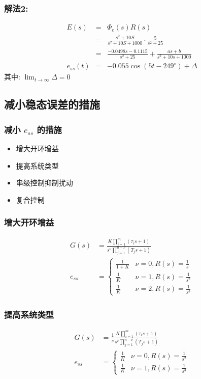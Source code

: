 \documentclass{article}
\begin{document}
\begin{frame}
\frametitle{解法2:}
\label{sec-3-3-10}

\begin{eqnarray*}
E(s) & = & \Phi_e(s)R(s) \\
     &=& \frac{s^2+10S}{s^2+10S+1000}\cdot\frac{5}{s^2+25}\\
     &=&\frac{-0.0498s-0.1115}{s^2+25}+\frac{as+b}{s^2+10s+1000}\\
e_{ss}(t)&=& -0.055\cos(5t-249^{\circ})+\Delta 
\end{eqnarray*}
其中: $\lim_{t\rightarrow\infty}\Delta = 0$
\end{frame}
\subsection{减小稳态误差的措施}
\label{sec-3-4}
\begin{frame}
\frametitle{减小 $e_{ss}$ 的措施}
\label{sec-3-4-1}

\begin{itemize}
\item <2->增大开环增益
\item <3->提高系统类型
\item <4->串级控制抑制扰动
\item <5->复合控制
\end{itemize}
\end{frame}
\begin{frame}
\frametitle{增大开环增益}
\label{sec-3-4-2}

\begin{align*}
G(s)    & = \frac{K\prod_{i=1}^{m}(\tau_{i}s+1)}{s^{\nu}\prod_{j=1}^{n-\nu}(T_{j}s+1)} \\
e_{ss}  &=
\begin{cases}
\frac{1}{1+K} & \nu=0,R(s)=\frac{1}{s} \\
\frac{1}{K} & \nu=1,R(s)=\frac{1}{s^2} \\
\frac{1}{K} & \nu=2,R(s)=\frac{1}{s^3} 
\end{cases}
\end{align*}
\end{frame}
\begin{frame}
\frametitle{提高系统类型}
\label{sec-3-4-3}

\begin{align*}
G(s)    & = \frac{1}{s}\frac{K\prod_{i=1}^{m}(\tau_{i}s+1)}{s^{\nu}\prod_{j=1}^{n-\nu}(T_{j}s+1)} \\
e_{ss}  &=
\begin{cases}
\frac{1}{K} & \nu=0,R(s)=\frac{1}{s^2} \\
\frac{1}{K} & \nu=1,R(s)=\frac{1}{s^3} 
\end{cases}
\end{align*}
\end{frame}
\end{document}
